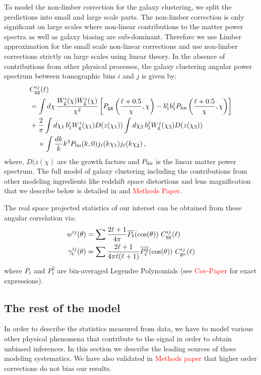 \documentclass[fleqn,usenatbib]{mnras}
\newcommand{\red}[1]{\textcolor{red}{#1}}
\begin{document}
To model the non-limber correction for the galaxy clustering, we split the predictions into small and large scale parts. The non-limber correction is only significant on large scales where non-linear contributions to the matter power spectra as well as galaxy biasing are sub-dominant. Therefore we use Limber approximation for the small scale non-linear corrections and use non-limber corrections strictly on large scales using linear theory. In the absence of contributions from other physical processes, the galaxy clustering angular power spectrum between tomographic bins $i$ and $j$ is given by:
\begin{align}\label{eq:Clgg_exact}
    &C_{\rm gg}^{ij} (\ell) \nonumber\\
    &= \int d\chi\, \frac{W_{\rm g}^i(\chi)W_{\rm g}^j(\chi)}{\chi^2} \left[P_{\rm gg}\left(\frac{\ell+0.5}{\chi},\chi\right)- b_1^{i} b_1^{j} P_{\rm lin}\left(\frac{\ell+0.5}{\chi},\chi\right)\right]\nonumber\\
    &+\frac{2}{\pi}\int d\chi_1\,b_{1}^i W_{\rm g}^i(\chi_1) D(z(\chi_1))\int d\chi_2\,b_{1}^j W_{\rm g}^j(\chi_2)D(z(\chi_2))\nonumber\\
    &\;\;\;\;\times \int\frac{dk}{k}k^3 P_{\rm lin}(k,0)j_\ell(k\chi_1)j_\ell(k\chi_2)\,,
\label{eq:Cl-DD_rewrite}
\end{align}
where, $D(z(\chi)$ are the growth factors and $P_{\rm lin}$ is the linear matter power spectrum. The full model of galaxy clustering including the contributions from other modeling ingredients like redshift space distortions and lens magnification that we describe below is detailed in \cite{Fang_nonlimber} and \red{Methods Paper}. 

The real space projected statistics of our interest can be obtained from these angular correlation via:
\begin{align}\label{eq:2pt_exact}
    w^{ij}(\theta) &= \sum \frac{2\ell + 1}{4\pi} \overline{P_{\ell}}(\cos(\theta)) \ C^{ij}_{\rm gg}(\ell) \\
    \gamma_{\rm t}^{ij}(\theta) &= \sum \frac{2\ell + 1}{4\pi \ell (\ell + 1)} \overline{P_{\ell}^2}(\cos(\theta)) \ C^{ij}_{\rm g\kappa}(\ell)
\end{align}
where $\overline{P_{\ell}}$ and $\overline{P_{\ell}^2}$ are bin-averaged Legendre Polynomials (see \red{Cov-Paper} for exact expressions). 

\subsection{The rest of the model}
\label{sec:model_rest}
In order to describe the statistics measured from data, we have to model various other physical phenomena that contribute to the signal in order to obtain unbiased inferences. In this section we describe the leading sources of these modeling systematics. We have also validated in \red{Methods paper} that higher order corrections do not bias our results. 
\end{document}

